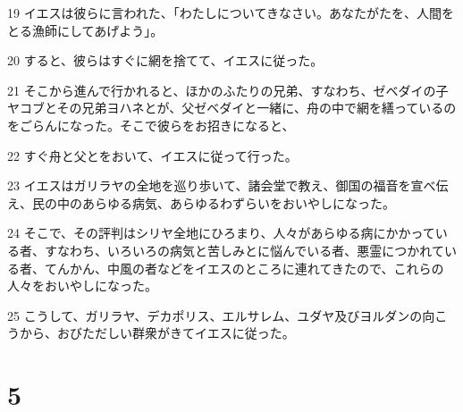 \par 19 イエスは彼らに言われた、「わたしについてきなさい。あなたがたを、人間をとる漁師にしてあげよう」。
\par 20 すると、彼らはすぐに網を捨てて、イエスに従った。
\par 21 そこから進んで行かれると、ほかのふたりの兄弟、すなわち、ゼベダイの子ヤコブとその兄弟ヨハネとが、父ゼベダイと一緒に、舟の中で網を繕っているのをごらんになった。そこで彼らをお招きになると、
\par 22 すぐ舟と父とをおいて、イエスに従って行った。
\par 23 イエスはガリラヤの全地を巡り歩いて、諸会堂で教え、御国の福音を宣べ伝え、民の中のあらゆる病気、あらゆるわずらいをおいやしになった。
\par 24 そこで、その評判はシリヤ全地にひろまり、人々があらゆる病にかかっている者、すなわち、いろいろの病気と苦しみとに悩んでいる者、悪霊につかれている者、てんかん、中風の者などをイエスのところに連れてきたので、これらの人々をおいやしになった。
\par 25 こうして、ガリラヤ、デカポリス、エルサレム、ユダヤ及びヨルダンの向こうから、おびただしい群衆がきてイエスに従った。

\chapter{5}

